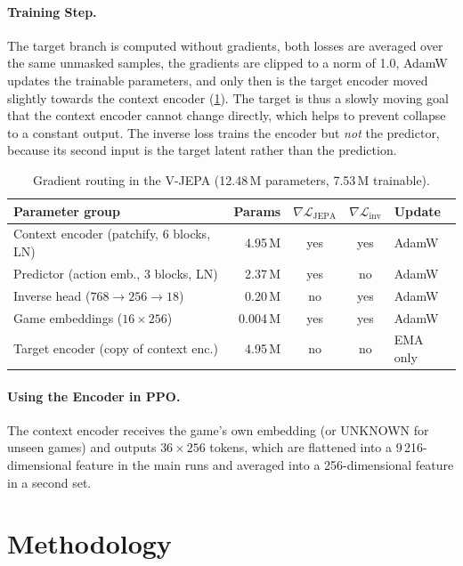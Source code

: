 \documentclass[runningheads]{llncs}
\begin{document}
\paragraph{Training Step.} The target branch is computed without gradients, both losses are
averaged over the same unmasked samples, the gradients are clipped to a norm of 1.0, AdamW
updates the trainable parameters, and only then is the target encoder moved slightly towards the context encoder (\cref{tab:grad}). The target is thus a slowly moving goal that the context encoder cannot change directly,
which helps to prevent collapse to a constant output.
The inverse loss trains the encoder but \emph{not} the predictor, because its second input is
the target latent rather than the prediction.

\begin{table}[!htbp]
\centering
\caption{Gradient routing in the V-JEPA (12.48\,M parameters, 7.53\,M trainable).}
\label{tab:grad}
\footnotesize\setlength{\tabcolsep}{4pt}
\begin{tabular}{@{}lrccl@{}}
\toprule
Parameter group & Params & $\nabla\mathcal{L}_{\text{JEPA}}$ & $\nabla\mathcal{L}_{\text{inv}}$ & Update \\
\midrule
Context encoder (patchify, 6 blocks, LN) & 4.95\,M & yes & yes & AdamW \\
Predictor (action emb., 3 blocks, LN) & 2.37\,M & yes & no & AdamW \\
Inverse head ($768\to256\to18$) & 0.20\,M & no & yes & AdamW \\
Game embeddings ($16\times256$) & 0.004\,M & yes & yes & AdamW \\
Target encoder (copy of context enc.) & 4.95\,M & no & no & EMA only \\
\bottomrule
\end{tabular}
\end{table}

\paragraph{Using the Encoder in PPO.} The context encoder receives the game's own embedding (or UNKNOWN for
unseen games) and outputs $36\times256$ tokens, which are flattened into a 9\,216-dimensional
feature in the main runs and averaged into a 256-dimensional feature in a second set.

\section{Methodology}
\label{sec:method}
\end{document}
